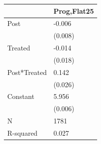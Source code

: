 \begin{tabular}{ll}
\toprule
 & Prog,Flat25 \\
\midrule
Post & -0.006 \\
 & (0.008) \\
Treated & -0.014 \\
 & (0.018) \\
Post*Treated & 0.142 \\
 & (0.026) \\
Constant & 5.956 \\
 & (0.006) \\
N & 1781 \\
R-squared & 0.027 \\
\bottomrule
\end{tabular}
